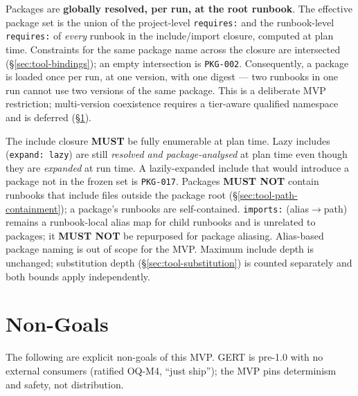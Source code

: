 Packages are \textbf{globally resolved, per run, at the root runbook}. The
effective package set is the union of the project-level \texttt{requires:}
and the runbook-level \texttt{requires:} of \emph{every} runbook in the
include/import closure, computed at plan time. Constraints for the same
package name across the closure are intersected
(\S\ref{sec:tool-bindings}); an empty intersection is \texttt{PKG-002}.
Consequently, a package is loaded once per run, at one version, with one
digest --- two runbooks in one run cannot use two versions of the same
package. This is a deliberate MVP restriction; multi-version coexistence
requires a tier-aware qualified namespace and is deferred
(\S\ref{sec:tool-packages-nongoals}).

The include closure \textbf{MUST} be fully enumerable at plan time. Lazy
includes (\texttt{expand: lazy}) are still \emph{resolved and
package-analysed} at plan time even though they are \emph{expanded} at run
time. A lazily-expanded include that would introduce a package not in the
frozen set is \texttt{PKG-017}. Packages \textbf{MUST NOT} contain runbooks
that include files outside the package root (\S\ref{sec:tool-path-containment});
a package's runbooks are self-contained. \texttt{imports:} (alias$\to$path)
remains a runbook-local alias map for child runbooks and is unrelated to
packages; it \textbf{MUST NOT} be repurposed for package aliasing.
Alias-based package naming is out of scope for the MVP. Maximum include
depth is unchanged; substitution depth (\S\ref{sec:tool-substitution}) is
counted separately and both bounds apply independently.

\section{Non-Goals}
\label{sec:tool-packages-nongoals}

The following are explicit non-goals of this MVP. GERT is pre-1.0 with no
external consumers (ratified OQ-M4, ``just ship''); the MVP pins determinism
and safety, not distribution.

